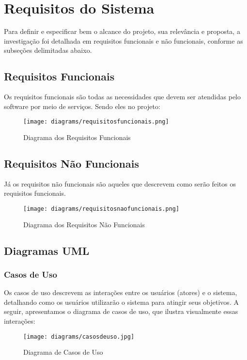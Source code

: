 \documentclass[../main.tex]{subfiles}
\begin{document}
\tableofcontents
\listoffigures
\clearpage

\section{Requisitos do Sistema}
Para definir e especificar bem o alcance do projeto, sua relevância e proposta, a investigação foi detalhada em requisitos funcionais e não funcionais, conforme as subseções delimitadas abaixo. 
\subsection{Requisitos Funcionais}
Os requisitos funcionais são todas as necessidades que devem ser atendidas pelo software por meio de serviços. Sendo eles no projeto: 
\vspace{3cm}
\begin{figure}[htbp]
    \centering
    \texttt{[image: diagrams/requisitosfuncionais.png]}
    \caption{Diagrama dos Requisitos Funcionais}
    \label{fig:requisitos-funcionais}
\end{figure}
\subsection{Requisitos Não Funcionais}
Já os requisitos não funcionais são aqueles que descrevem como serão feitos os requisitos funcionais.
\vspace{3cm}
\begin{figure}[htbp]
    \centering
    \texttt{[image: diagrams/requisitosnaofuncionais.png]}
    \caption{Diagrama dos Requisitos Não Funcionais}
    \label{fig:requisitos-nao-funcionais}
\end{figure}
\newpage
\subsection{Diagramas UML}
\subsubsection{Casos de Uso}
Os casos de uso descrevem as interações entre os usuários (atores) e o sistema, detalhando como os usuários utilizarão o sistema para atingir seus objetivos. A seguir, apresentamos o diagrama de casos de uso, que ilustra visualmente essas interações:

\vspace{3cm}
\begin{figure}[htbp]
    \centering
    \texttt{[image: diagrams/casosdeuso.jpg]}
    \caption{Diagrama de Casos de Uso}
    \label{fig:casos-de-uso}
\end{figure}
\newpage
\end{document}
